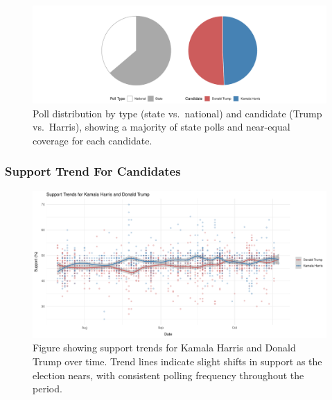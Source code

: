 \documentclass[
  letterpaper,
  DIV=11,
  numbers=noendperiod]{scrartcl}
\begin{document}
\begin{figure}

{\centering \includegraphics{paper_files/figure-pdf/fig-pie-1.pdf}

}

\caption{\label{fig-pie}Poll distribution by type (state vs.~national)
and candidate (Trump vs.~Harris), showing a majority of state polls and
near-equal coverage for each candidate.}

\end{figure}

\newpage

\hypertarget{support-trend-for-candidates}{%
\subsubsection{Support Trend For
Candidates}\label{support-trend-for-candidates}}

\begin{figure}

{\centering \includegraphics{paper_files/figure-pdf/fig-trend-1.pdf}

}

\caption{\label{fig-trend}Figure showing support trends for Kamala
Harris and Donald Trump over time. Trend lines indicate slight shifts in
support as the election nears, with consistent polling frequency
throughout the period.}

\end{figure}
\end{document}
